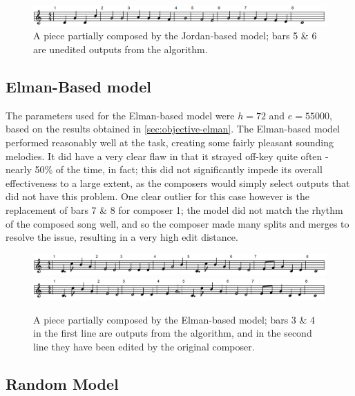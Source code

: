 \documentclass[ author={Stephen Livermore-Tozer},
				supervisor={Dr. Peter Flach},
				degree={MEng},
				title={Algorithmic Co-composition Using Machine Learning},
				subtitle={},
				type={research},
				year={2016} ]{dissertation}
\begin{document}
	\begin{figure}[h]
		\centering
		\includegraphics[width=1.0\textwidth]{jordan-perfect-example}
		\caption{A piece partially composed by the Jordan-based model; bars 5 \& 6 are unedited outputs from the algorithm.}
	\end{figure}
	
	\subsection{Elman-Based model}
	
	The parameters used for the Elman-based model were $h = 72$ and $e = 55000$, based on the results obtained in \ref{sec:objective-elman}. The Elman-based model performed reasonably well at the task, creating some fairly pleasant sounding melodies. It did have a very clear flaw in that it strayed off-key quite often - nearly 50\% of the time, in fact; this did not significantly impede its overall effectiveness to a large extent, as the composers would simply select outputs that did not have this problem. One clear outlier for this case however is the replacement of bars 7 \& 8 for composer 1; the model did not match the rhythm of the composed song well, and so the composer made many splits and merges to resolve the issue, resulting in a very high edit distance.
	
	\begin{figure}[h]
		\centering
		\includegraphics[width=1.0\textwidth]{elman-unedited-example}
		\includegraphics[width=1.0\textwidth]{elman-edited-example}
		\caption{A piece partially composed by the Elman-based model; bars 3 \& 4 in the first line are outputs from the algorithm, and in the second line they have been edited by the original composer.}
	\end{figure}
	
	
	\subsection{Random Model}
\end{document}
